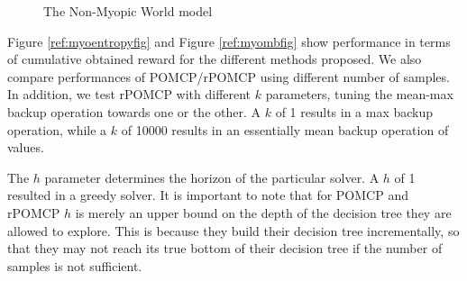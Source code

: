 \begin{figure}[ht]
\centering
{}
\caption{The Non-Myopic World model}
\label{ref:nonmyo1}
\end{figure}

Figure \ref{ref:myoentropyfig} and Figure \ref{ref:myombfig} show performance in terms of cumulative
obtained reward for the different methods proposed. We also compare performances of POMCP/rPOMCP
using different number of samples. In addition, we test rPOMCP with different $k$ parameters, tuning
the mean-max backup operation towards one or the other. A $k$ of 1 results in a max backup
operation, while a $k$ of 10000 results in an essentially mean backup operation of values.

The $h$ parameter determines the horizon of the particular solver. A $h$ of 1 resulted in a greedy
solver. It is important to note that for POMCP and rPOMCP $h$ is merely an upper bound on the depth
of the decision tree they are allowed to explore. This is because they build their decision tree
incrementally, so that they may not reach its true bottom of their decision tree if the number of
samples is not sufficient.

